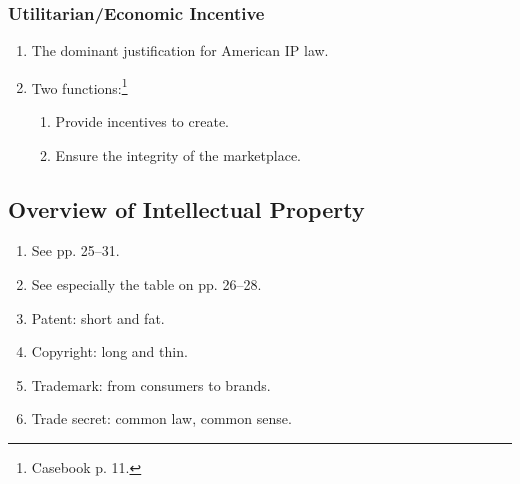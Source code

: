 \subsubsection{Utilitarian/Economic Incentive}

\begin{enumerate}
    \item The dominant justification for American IP law.
    \item Two functions:\footnote{Casebook p. 11.}
    \begin{enumerate}
        \item Provide incentives to create.
        \item Ensure the integrity of the marketplace.
    \end{enumerate}
\end{enumerate}

\subsection{Overview of Intellectual Property}

\begin{enumerate}
    \item See pp. 25--31.
    \item See especially the table on pp. 26--28.
    \item Patent: short and fat.
    \item Copyright: long and thin.
    \item Trademark: from consumers to brands.
    \item Trade secret: common law, common sense.
\end{enumerate}
